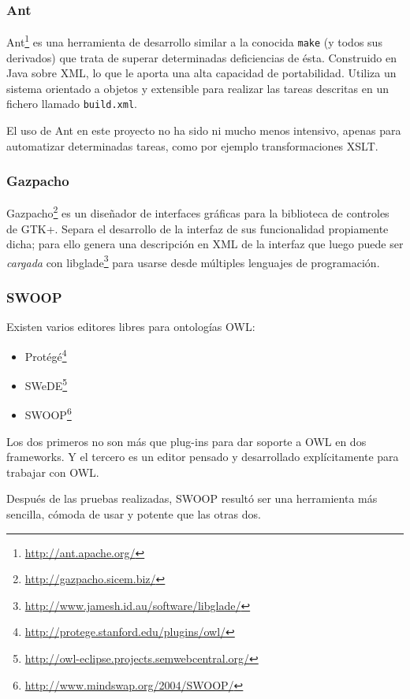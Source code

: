\subsubsection{Ant}

Ant\footnote{\url{http://ant.apache.org/}} es una herramienta de desarrollo 
similar a la conocida \texttt{make} (y todos sus derivados) que trata de 
superar determinadas deficiencias de ésta. Construido en Java sobre XML, 
lo que le aporta una alta capacidad de portabilidad. Utiliza un sistema 
orientado a objetos y extensible para realizar las tareas descritas en un 
fichero llamado \texttt{build.xml}.

El uso de Ant en este proyecto no ha sido ni mucho menos intensivo, apenas para
automatizar determinadas tareas, como por ejemplo transformaciones XSLT.

\subsubsection{Gazpacho}

Gazpacho\footnote{\url{http://gazpacho.sicem.biz/}} es un diseñador de interfaces
gráficas para la biblioteca de controles de GTK+. Separa el desarrollo de la interfaz
de sus funcionalidad propiamente dicha; para ello genera una descripción en XML
de la interfaz que luego puede ser \emph{cargada} con 
libglade\footnote{\url{http://www.jamesh.id.au/software/libglade/}} para usarse
desde múltiples lenguajes de programación.

\subsubsection{SWOOP}

Existen varios editores libres para ontologías OWL:

\begin{itemize}
  \item Protégé\footnote{\url{http://protege.stanford.edu/plugins/owl/}}
  \item SWeDE\footnote{\url{http://owl-eclipse.projects.semwebcentral.org/}}
  \item SWOOP\footnote{\url{http://www.mindswap.org/2004/SWOOP/}}
\end{itemize}

Los dos primeros no son más que plug-ins para dar soporte a OWL en dos 
frameworks. Y el tercero es un editor pensado y desarrollado explícitamente
para trabajar con OWL.

Después de las pruebas realizadas, SWOOP resultó ser una herramienta más sencilla,
cómoda de usar y potente que las otras dos.

